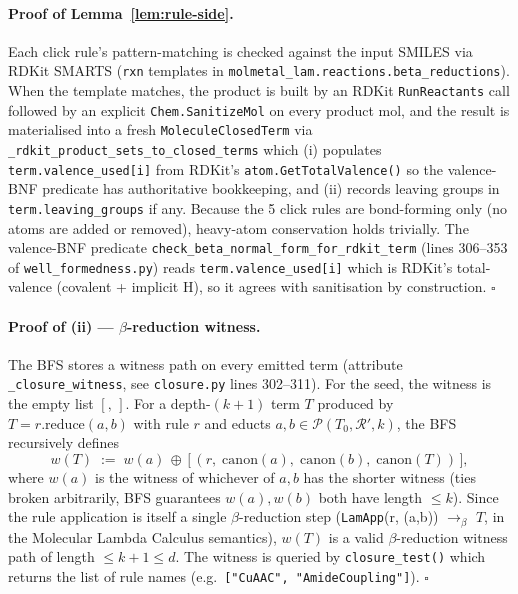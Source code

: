 \paragraph{Proof of Lemma~\ref{lem:rule-side}.}
Each click rule's pattern-matching is checked against the input
SMILES via RDKit SMARTS (\texttt{rxn} templates in
\texttt{molmetal\_lam.reactions.beta\_reductions}).  When the
template matches, the product is built by an RDKit
\texttt{RunReactants} call followed by an explicit
\texttt{Chem.SanitizeMol} on every product mol, and the result is
materialised into a fresh \texttt{MoleculeClosedTerm} via
\texttt{\_rdkit\_product\_sets\_to\_closed\_terms} which (i)
populates \texttt{term.valence\_used[i]} from RDKit's
\texttt{atom.GetTotalValence()} so the valence-BNF predicate has
authoritative bookkeeping, and (ii) records leaving groups in
\texttt{term.leaving\_groups} if any.  Because the 5 click rules are
bond-forming only (no atoms are added or removed), heavy-atom
conservation holds trivially.  The valence-BNF predicate
\texttt{check\_beta\_normal\_form\_for\_rdkit\_term} (lines
306--353 of \texttt{well\_formedness.py}) reads
\texttt{term.valence\_used[i]} which is RDKit's
total-valence (covalent + implicit H), so it agrees with
sanitisation by construction.  $\square$

\paragraph{Proof of (ii) — $\beta$-reduction witness.}

The BFS stores a witness path on every emitted term (attribute
\texttt{\_closure\_witness}, see
\texttt{closure.py} lines 302--311).  For the seed, the witness is
the empty list $[,\,]$.  For a depth-$(k{+}1)$ term $T$ produced
by $T = r.\mathrm{reduce}(a, b)$ with rule $r$ and educts
$a, b \in \mathcal{P}(T_0, \mathcal{R}', k)$, the BFS recursively
defines
\begin{equation}
  w(T) \;:=\; w(a) \,\oplus\, \bigl[\, (r,\;
            \mathrm{canon}(a),\;
            \mathrm{canon}(b),\;
            \mathrm{canon}(T)) \,\bigr],
  \label{eq:witness-extend}
\end{equation}
where $w(a)$ is the witness of whichever of $a, b$ has the shorter
witness (ties broken arbitrarily, BFS guarantees $w(a), w(b)$
both have length $\le k$).  Since the rule application is itself
a single $\beta$-reduction step
(\texttt{LamApp}(r, (a,b)) $\rightarrow_{\beta}$ $T$, in the
Molecular Lambda Calculus semantics), $w(T)$ is a valid
$\beta$-reduction witness path of length $\le k+1 \le d$.  The
witness is queried by \texttt{closure\_test()} which returns the
list of rule names (e.g.\ \texttt{["CuAAC", "AmideCoupling"]}).
$\square$

